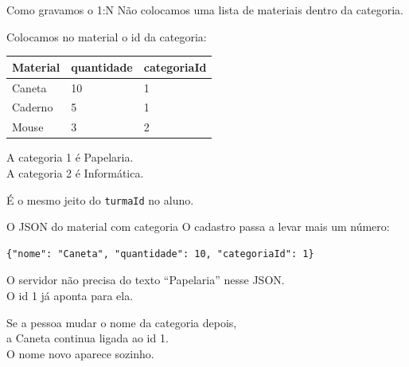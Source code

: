 \documentclass[aspectratio=169,11pt]{beamer}
\begin{document}
\begin{frame}{Como gravamos o 1{:}N}
  Não colocamos uma lista de materiais dentro da categoria.

  \vspace{0.5em}
  Colocamos no material o id da categoria:

  \vspace{0.4em}
  \begin{center}
  \begin{tabular}{lll}
    \toprule
    Material & quantidade & categoriaId \\
    \midrule
    Caneta & 10 & 1 \\
    Caderno & 5 & 1 \\
    Mouse & 3 & 2 \\
    \bottomrule
  \end{tabular}
  \end{center}

  \vspace{0.5em}
  A categoria 1 é Papelaria.\\
  A categoria 2 é Informática.

  \vspace{0.4em}
  É o mesmo jeito do \texttt{turmaId} no aluno.
\end{frame}

\begin{frame}[fragile]{O JSON do material com categoria}
  O cadastro passa a levar mais um número:

  \vspace{0.4em}
\begin{lstlisting}[basicstyle=\ttfamily\footnotesize]
{"nome": "Caneta", "quantidade": 10, "categoriaId": 1}
\end{lstlisting}

  \vspace{0.5em}
  O servidor não precisa do texto ``Papelaria'' nesse JSON.\\
  O id 1 já aponta para ela.

  \vspace{0.5em}
  Se a pessoa mudar o nome da categoria depois,\\
  a Caneta continua ligada ao id 1.\\
  O nome novo aparece sozinho.
\end{frame}
\end{document}
